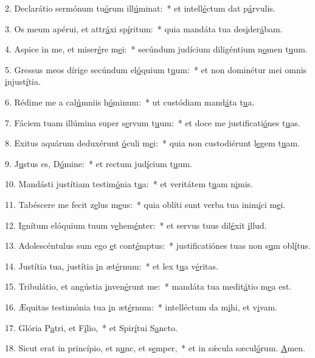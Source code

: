 2. Declarátio sermónum tu\uline{ó}rum ill\uline{ú}minat:~* et intell\uline{é}ctum dat p\uline{á}rvulis.\par 
3. Os meum apérui, et attr\uline{á}xi sp\uline{í}ritum:~* quia mandáta tua des\uline{i}der\uline{á}bam.\par 
4. Aspice in me, et miser\uline{é}re m\uline{e}i:~* secúndum judícium diligéntium n\uline{o}men t\uline{u}um.\par 
5. Gressus meos dírige secúndum el\uline{ó}quium t\uline{u}um:~* et non dominétur mei omnis \uline{i}njust\uline{í}tia.\par 
6. Rédime me a cal\uline{ú}mniis h\uline{ó}minum:~* ut custódiam mand\uline{á}ta t\uline{u}a.\par 
7. Fáciem tuam illúmina super s\uline{e}rvum t\uline{u}um:~* et doce me justificati\uline{ó}nes t\uline{u}as.\par 
8. Exitus aquárum deduxérunt \uline{ó}culi m\uline{e}i:~* quia non custodiérunt l\uline{e}gem t\uline{u}am.\par 
9. J\uline{u}stus es, D\uline{ó}mine:~* et rectum jud\uline{í}cium t\uline{u}um.\par 
10. Mandásti justítiam testim\uline{ó}nia t\uline{u}a:~* et veritátem t\uline{u}am n\uline{i}mis.\par 
11. Tabéscere me fecit z\uline{e}lus m\uline{e}us:~* quia oblíti sunt verba tua inim\uline{í}ci m\uline{e}i.\par 
12. Ignítum elóquium tuum v\uline{e}hem\uline{é}nter:~* et servus tuus dil\uline{é}xit \uline{i}llud.\par 
13. Adolescéntulus sum ego \uline{e}t cont\uline{é}mptus:~* justificatiónes tuas non s\uline{u}m obl\uline{í}tus.\par 
14. Justítia tua, justítia \uline{i}n æt\uline{é}rnum:~* et lex t\uline{u}a v\uline{é}ritas.\par 
15. Tribulátio, et angústia \uline{i}nven\uline{é}runt me:~* mandáta tua medit\uline{á}tio m\uline{e}a est.\par 
16. Æquitas testimónia tua \uline{i}n æt\uline{é}rnum:~* intelléctum da m\uline{i}hi, et v\uline{i}vam.\par 
17. Glória P\uline{a}tri, et F\uline{í}lio,~* et Spir\uline{í}tui S\uline{a}ncto.\par 
18. Sicut erat in princípio, et n\uline{u}nc, et s\uline{e}mper,~* et in sǽcula sæcul\uline{ó}rum. \uline{A}men.\par 
